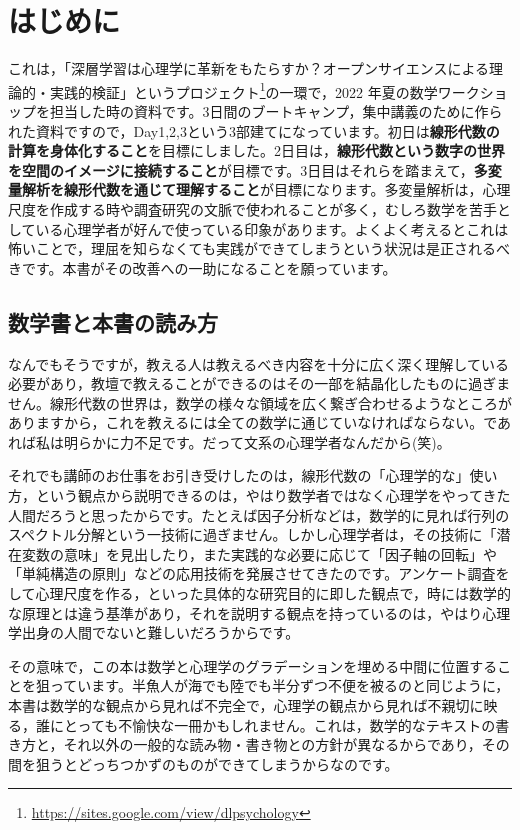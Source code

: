 \section*{はじめに}

これは，「深層学習は心理学に革新をもたらすか？オープンサイエンスによる理論的・実践的検証」というプロジェクト\footnote{\url{https://sites.google.com/view/dlpsychology}}の一環で，2022 年夏の数学ワークショップを担当した時の資料です。3日間のブートキャンプ，集中講義のために作られた資料ですので，Day1,2,3という3部建てになっています。初日は\textbf{線形代数の計算を身体化すること}を目標にしました。2日目は，\textbf{線形代数という数字の世界を空間のイメージに接続すること}が目標です。3日目はそれらを踏まえて，\textbf{多変量解析を線形代数を通じて理解すること}が目標になります。多変量解析は，心理尺度を作成する時や調査研究の文脈で使われることが多く，むしろ数学を苦手としている心理学者が好んで使っている印象があります。よくよく考えるとこれは怖いことで，理屈を知らなくても実践ができてしまうという状況は是正されるべきです。本書がその改善への一助になることを願っています。

\subsection*{数学書と本書の読み方}

なんでもそうですが，教える人は教えるべき内容を十分に広く深く理解している必要があり，教壇で教えることができるのはその一部を結晶化したものに過ぎません。線形代数の世界は，数学の様々な領域を広く繋ぎ合わせるようなところがありますから，これを教えるには全ての数学に通じていなければならない。であれば私は明らかに力不足です。だって文系の心理学者なんだから(笑)。

それでも講師のお仕事をお引き受けしたのは，線形代数の「心理学的な」使い方，という観点から説明できるのは，やはり数学者ではなく心理学をやってきた人間だろうと思ったからです。たとえば因子分析などは，数学的に見れば行列のスペクトル分解という一技術に過ぎません。しかし心理学者は，その技術に「潜在変数の意味」を見出したり，また実践的な必要に応じて「因子軸の回転」や「単純構造の原則」などの応用技術を発展させてきたのです。アンケート調査をして心理尺度を作る，といった具体的な研究目的に即した観点で，時には数学的な原理とは違う基準があり，それを説明する観点を持っているのは，やはり心理学出身の人間でないと難しいだろうからです。

その意味で，この本は数学と心理学のグラデーションを埋める中間に位置することを狙っています。半魚人が海でも陸でも半分ずつ不便を被るのと同じように，本書は数学的な観点から見れば不完全で，心理学の観点から見れば不親切に映る，誰にとっても不愉快な一冊かもしれません。これは，数学的なテキストの書き方と，それ以外の一般的な読み物・書き物との方針が異なるからであり，その間を狙うとどっちつかずのものができてしまうからなのです。

